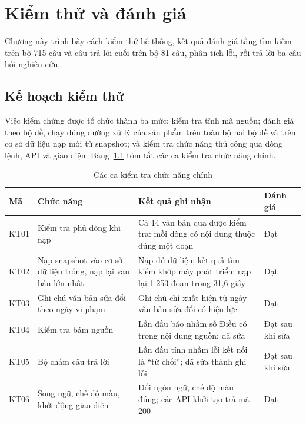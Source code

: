 \chapter{Kiểm thử và đánh giá}
\label{chap:kiem-thu-danh-gia}

Chương này trình bày cách kiểm thử hệ thống, kết quả đánh giá tầng tìm kiếm trên bộ 715 câu và câu trả lời cuối trên bộ 81 câu, phân tích lỗi, rồi trả lời ba câu hỏi nghiên cứu.

\section{Kế hoạch kiểm thử}
\label{sec:ch5-ke-hoach}

Việc kiểm chứng được tổ chức thành ba mức: kiểm tra tĩnh mã nguồn; đánh giá theo bộ đề, chạy đúng đường xử lý của sản phẩm trên toàn bộ hai bộ đề và trên cơ sở dữ liệu nạp mới từ snapshot; và kiểm tra chức năng thủ công qua dòng lệnh, API và giao diện. Bảng~\ref{tab:ch5-kiem-thu-chuc-nang} tóm tắt các ca kiểm tra chức năng chính.

\begin{table}[H]
\centering
\caption{Các ca kiểm tra chức năng chính}
\label{tab:ch5-kiem-thu-chuc-nang}
\footnotesize
\begin{tabularx}{\textwidth}{@{}l >{\raggedright\arraybackslash}p{3.6cm} >{\raggedright\arraybackslash}X l@{}}
\toprule
\textbf{Mã} & \textbf{Chức năng} & \textbf{Kết quả ghi nhận} & \textbf{Đánh giá} \\
\midrule
KT01 & Kiểm tra phủ dòng khi nạp & Cả 14 văn bản qua được kiểm tra: mỗi dòng có nội dung thuộc đúng một đoạn & Đạt \\
KT02 & Nạp snapshot vào cơ sở dữ liệu trống, nạp lại văn bản lớn nhất & Nạp đủ dữ liệu; kết quả tìm kiếm khớp máy phát triển; nạp lại 1.253 đoạn trong 31,6 giây & Đạt \\
KT03 & Ghi chú văn bản sửa đổi theo ngày vi phạm & Ghi chú chỉ xuất hiện từ ngày văn bản sửa đổi có hiệu lực & Đạt \\
KT04 & Kiểm tra bám nguồn & Lần đầu báo nhầm số Điều có trong nội dung nguồn; đã sửa & Đạt sau khi sửa \\
KT05 & Bộ chấm câu trả lời & Lần đầu tính nhầm lỗi kết nối là ``từ chối''; đã sửa thành ghi lỗi & Đạt sau khi sửa \\
KT06 & Song ngữ, chế độ màu, khởi động giao diện & Đổi ngôn ngữ, chế độ màu đúng; các API khởi tạo trả mã 200 & Đạt \\
\bottomrule
\end{tabularx}
\end{table}

